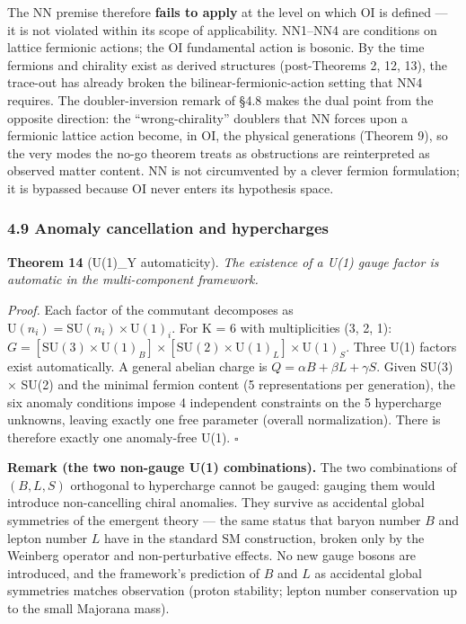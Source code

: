 \documentclass[
]{article}
\begin{document}
The NN premise therefore \textbf{fails to apply} at the level on which
OI is defined --- it is not violated within its scope of applicability.
NN1--NN4 are conditions on lattice fermionic actions; the OI fundamental
action is bosonic. By the time fermions and chirality exist as derived
structures (post-Theorems 2, 12, 13), the trace-out has already broken
the bilinear-fermionic-action setting that NN4 requires. The
doubler-inversion remark of §4.8 makes the dual point from the opposite
direction: the ``wrong-chirality'' doublers that NN forces upon a
fermionic lattice action become, in OI, the physical generations
(Theorem 9), so the very modes the no-go theorem treats as obstructions
are reinterpreted as observed matter content. NN is not circumvented by
a clever fermion formulation; it is bypassed because OI never enters its
hypothesis space.

\hypertarget{anomaly-cancellation-and-hypercharges}{%
\subsubsection{4.9 Anomaly cancellation and
hypercharges}\label{anomaly-cancellation-and-hypercharges}}

\textbf{Theorem 14} (U(1)\_Y automaticity). \emph{The existence of a
U(1) gauge factor is automatic in the multi-component framework.}

\emph{Proof.} Each factor of the commutant decomposes as
\(\mathrm{U}(n_i) = \mathrm{SU}(n_i) \times \mathrm{U}(1)_i\). For K = 6
with multiplicities (3, 2, 1):
\(G = [\mathrm{SU}(3) \times \mathrm{U}(1)_B] \times [\mathrm{SU}(2) \times \mathrm{U}(1)_L] \times \mathrm{U}(1)_S\).
Three U(1) factors exist automatically. A general abelian charge is
\(Q = \alpha B + \beta L + \gamma S\). Given SU(3) × SU(2) and the
minimal fermion content (5 representations per generation), the six
anomaly conditions impose 4 independent constraints on the 5 hypercharge
unknowns, leaving exactly one free parameter (overall normalization).
There is therefore exactly one anomaly-free U(1). \(\square\)

\textbf{Remark (the two non-gauge U(1) combinations).} The two
combinations of \((B, L, S)\) orthogonal to hypercharge cannot be
gauged: gauging them would introduce non-cancelling chiral anomalies.
They survive as accidental global symmetries of the emergent theory ---
the same status that baryon number \(B\) and lepton number \(L\) have in
the standard SM construction, broken only by the Weinberg operator and
non-perturbative effects. No new gauge bosons are introduced, and the
framework's prediction of \(B\) and \(L\) as accidental global
symmetries matches observation (proton stability; lepton number
conservation up to the small Majorana mass).
\end{document}
